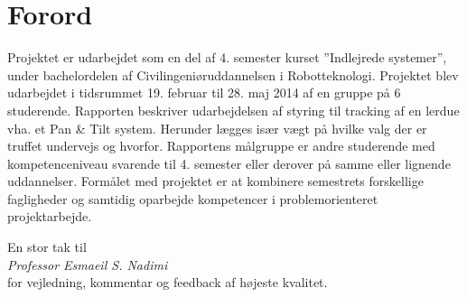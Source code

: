 \section*{Forord}
Projektet er udarbejdet som en del af 4. semester kurset ”Indlejrede systemer”, under bachelordelen af Civilingeniøruddannelsen i Robotteknologi. 
Projektet blev udarbejdet i tidsrummet 19. februar til 28. maj 2014 af en gruppe på 6 studerende.
Rapporten beskriver udarbejdelsen af styring til tracking af en lerdue vha. et Pan \& Tilt system.
Herunder lægges især vægt på hvilke valg der er truffet undervejs og hvorfor. 
Rapportens målgruppe er andre studerende med kompetenceniveau svarende til 4. semester eller derover på samme eller lignende uddannelser.
Formålet med projektet er at kombinere semestrets forskellige fagligheder og samtidig oparbejde kompetencer i problemorienteret projektarbejde.
\bigskip
\begin{center}
En stor tak til \\
\textit{Professor Esmaeil S. Nadimi} \\ 
for vejledning, kommentar og feedback af højeste kvalitet.
\end{center}





